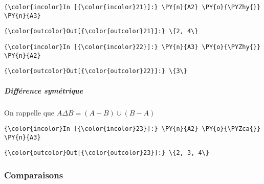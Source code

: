     \begin{Verbatim}[commandchars=\\\{\},frame=single,framerule=0.3mm,rulecolor=\color{cellframecolor}]
{\color{incolor}In [{\color{incolor}21}]:} \PY{n}{A2} \PY{o}{\PYZhy{}} \PY{n}{A3}
\end{Verbatim}


\begin{Verbatim}[commandchars=\\\{\},frame=single,framerule=0.3mm,rulecolor=\color{cellframecolor}]
{\color{outcolor}Out[{\color{outcolor}21}]:} \{2, 4\}
\end{Verbatim}
            
    \begin{Verbatim}[commandchars=\\\{\},frame=single,framerule=0.3mm,rulecolor=\color{cellframecolor}]
{\color{incolor}In [{\color{incolor}22}]:} \PY{n}{A3} \PY{o}{\PYZhy{}} \PY{n}{A2}
\end{Verbatim}


\begin{Verbatim}[commandchars=\\\{\},frame=single,framerule=0.3mm,rulecolor=\color{cellframecolor}]
{\color{outcolor}Out[{\color{outcolor}22}]:} \{3\}
\end{Verbatim}
            
    \hypertarget{diffuxe9rence-symuxe9trique}{%
\subparagraph{Différence symétrique}\label{diffuxe9rence-symuxe9trique}}

    On rappelle que \(A \Delta B = (A - B) \cup (B - A)\)

    \begin{Verbatim}[commandchars=\\\{\},frame=single,framerule=0.3mm,rulecolor=\color{cellframecolor}]
{\color{incolor}In [{\color{incolor}23}]:} \PY{n}{A2} \PY{o}{\PYZca{}} \PY{n}{A3}
\end{Verbatim}


\begin{Verbatim}[commandchars=\\\{\},frame=single,framerule=0.3mm,rulecolor=\color{cellframecolor}]
{\color{outcolor}Out[{\color{outcolor}23}]:} \{2, 3, 4\}
\end{Verbatim}
            
    \hypertarget{comparaisons}{%
\subsubsection{Comparaisons}\label{comparaisons}}

